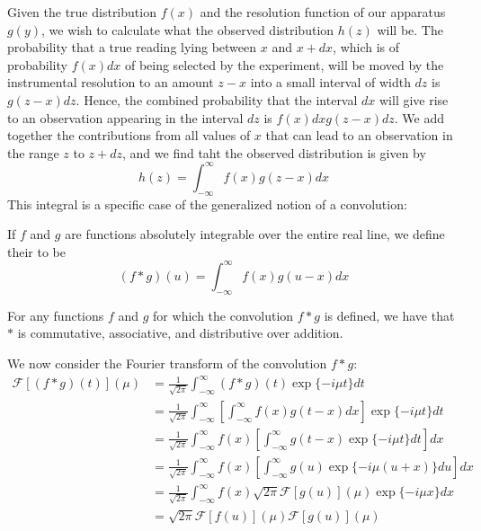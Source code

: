 \documentclass[12pt, a4paper, oneside, openright, titlepage]{book}
\begin{document}
Given the true distribution $f(x)$ and the resolution function of our apparatus $g(y)$, we wish to calculate what the observed distribution $h(z)$ will be. The probability that a true reading lying between $x$ and $x+dx$, which is of probability $f(x)dx$ of being selected by the experiment, will be moved by the instrumental resolution to an amount $z-x$ into a small interval of width $dz$ is $g(z-x)dz$. Hence, the combined probability that the interval $dx$ will give rise to an observation appearing in the interval $dz$ is $f(x)dxg(z-x)dz$. We add together the contributions from all values of $x$ that can lead to an observation in the range $z$ to $z+dz$, and we find taht the observed distribution is given by \begin{equation*}
    h(z) = \int_{-\infty}^{\infty}f(x)g(z-x)dx
\end{equation*}
This integral is a specific case of the generalized notion of a convolution:

\begin{defn}
    If $f$ and $g$ are functions absolutely integrable over the entire real line, we define their  to be \begin{equation}
        (f*g)(u) = \int_{-\infty}^{\infty}f(x)g(u-x)dx
    \end{equation}
\end{defn}

\begin{prop}
    For any functions $f$ and $g$ for which the convolution $f*g$ is defined, we have that $*$ is commutative, associative, and distributive over addition.
\end{prop}

We now consider the Fourier transform of the convolution $f*g$: \begin{align*}
    \mathcal{F}[(f*g)(t)](\mu) &= \frac{1}{\sqrt{2\pi}}\int_{-\infty}^{\infty}(f*g)(t)\exp\{-i\mu t\}dt \\
    &= \frac{1}{\sqrt{2\pi}}\int_{-\infty}^{\infty}\left[\int_{-\infty}^{\infty}f(x)g(t-x)dx\right]\exp\{-i\mu t\}dt \\
    &= \frac{1}{\sqrt{2\pi}}\int_{-\infty}^{\infty}f(x)\left[\int_{-\infty}^{\infty}g(t-x)\exp\{-i\mu t\}dt\right]dx \\
    &= \frac{1}{\sqrt{2\pi}}\int_{-\infty}^{\infty}f(x)\left[\int_{-\infty}^{\infty}g(u)\exp\{-i\mu (u+x)\}du\right]dx \\
    &= \frac{1}{\sqrt{2\pi}}\int_{-\infty}^{\infty}f(x)\sqrt{2\pi}\mathcal{F}[g(u)](\mu)\exp\{-i\mu x\}dx \\
    &= \sqrt{2\pi}\mathcal{F}[f(u)](\mu)\mathcal{F}[g(u)](\mu)
\end{align*}
\end{document}

